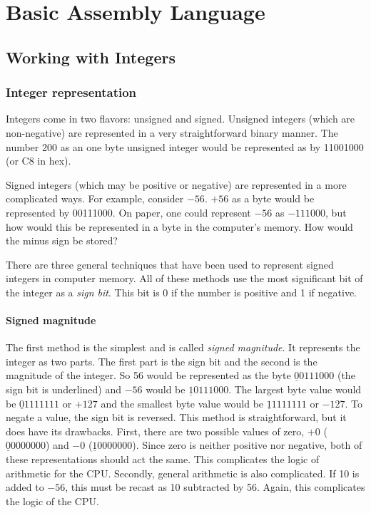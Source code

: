 
\chapter{Basic Assembly Language}

\section{Working with Integers }

\subsection{Integer representation }

Integers come in two flavors: unsigned and signed. Unsigned integers (which
are non-negative) are represented in a very straightforward binary manner.
The number 200 as an one byte unsigned integer would be represented as by
11001000 (or C8 in hex).

Signed integers (which may be positive or negative) are represented in a more
complicated ways. For example, consider $-56$. $+56$ as a byte would be
represented by 00111000. On paper, one could represent $-56$ as $-111000$,
but how would this be represented in a byte in the computer's memory.
How would the minus sign be stored?

There are three general techniques that have been used to represent
signed integers in computer memory. All of these methods use the most
significant bit of the integer as a \emph{sign
bit}.  This bit is 0 if the number is positive
and 1 if negative.

\subsubsection{Signed magnitude }

The first method is the simplest and is called \emph{signed magnitude}. It
represents the integer as two parts. The first part is the sign bit and
the second is the magnitude of the integer. So 56 would be represented as
the byte $\underline{0}0111000$ (the sign bit is underlined) and $-56$
would be $\underline{1}0111000$. The largest byte value would be
$\underline{0}1111111$ or $+127$ and the smallest byte value would be
$\underline{1}1111111$ or $-127$. To negate a value, the sign bit is reversed.
This method is straightforward, but it does have its drawbacks. First,
there are two possible values of zero, $+0$ ($\underline{0}0000000$) and
$-0$ ($\underline{1}0000000$). Since zero is neither positive nor negative,
both of these representations should act the same. This complicates the logic
of arithmetic for the CPU. Secondly, general arithmetic is also complicated.
If 10 is added to $-56$, this must be recast as 10 subtracted by 56. Again,
this complicates the logic of the CPU.

